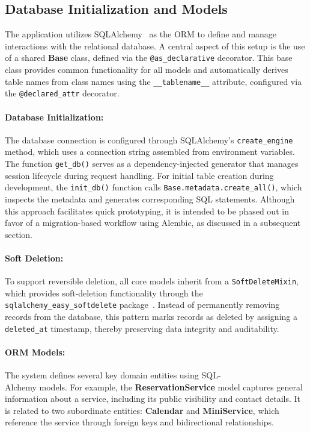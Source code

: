 \subsection{Database Initialization and Models}

The application utilizes SQLAlchemy~\cite{SQLAlchemy} as the ORM to define and manage interactions with the relational database. A central aspect of this setup is the use of a shared \textbf{Base} class, defined via the \texttt{@as\_declarative} decorator. This base class provides common functionality for all models and automatically derives table names from class names using the \texttt{\_\_tablename\_\_} attribute, configured via the \texttt{@declared\_attr} decorator.

\paragraph{Database Initialization:}
The database connection is configured through SQLAlchemy’s \texttt{create\_engine} method, which uses a connection string assembled from environment variables. The function \texttt{get\_db()} serves as a dependency-injected generator that manages session lifecycle during request handling. For initial table creation during development, the \texttt{init\_db()} function calls \texttt{Base.metadata.create\_all()}, which inspects the metadata and generates corresponding SQL statements. Although this approach facilitates quick prototyping, it is intended to be phased out in favor of a migration-based workflow using Alembic, as discussed in a subsequent section.

\paragraph{Soft Deletion:}
To support reversible deletion, all core models inherit from a \texttt{SoftDeleteMixin}, which provides soft-deletion functionality through the \texttt{sqlalchemy\_easy\_softdelete} package~\cite{SoftDelete}. Instead of permanently removing records from the database, this pattern marks records as deleted by assigning a \texttt{deleted\_at} timestamp, thereby preserving data integrity and auditability.

\paragraph{ORM Models:}
The system defines several key domain entities using SQL-\\Alchemy models. For example, the \textbf{ReservationService} model captures general information about a service, including its public visibility and contact details. It is related to two subordinate entities: \textbf{Calendar} and \textbf{MiniService}, which reference the service through foreign keys and bidirectional relationships.


